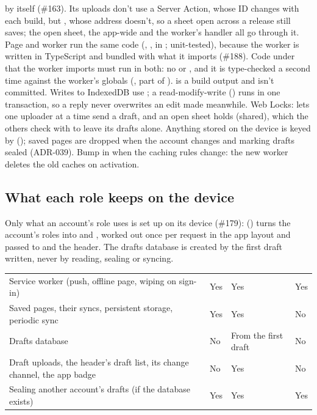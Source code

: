 by itself (\#163). Its uploads don't use a Server Action, whose ID changes with each build, but
, whose address doesn't, so a sheet open across a release still
saves; the open sheet, the app-wide  and the worker's  handler
all go through it. Page and worker run the same code (, ,
 in ; unit-tested), because the worker is written in
TypeScript and bundled with what it imports (\#188). Code under  that the worker
imports must run in both: no  or , and it is type-checked a second
time against the worker's globals (, part of ).
 is a build output and isn't committed. Writes to IndexedDB use ; a read-modify-write
() runs in one transaction, so a reply never overwrites an edit made
meanwhile. Web Locks:  lets one uploader at a time send a draft,
and an open sheet holds  (shared), which the others
check with  to leave its drafts alone. Anything stored
on the device is keyed by  (); saved pages
are dropped when the account changes and marking drafts sealed (ADR-039). Bump  in  when the caching rules
change: the new worker deletes the old caches on activation.

\subsection*{What each role keeps on the device}
Only what an account's role uses is set up on its device (\#179): 
() turns the account's roles into  and ,
worked out once per request in the app layout and passed to  and the header.
The drafts database is created by the first draft written, never by reading, sealing or syncing.

{\tablefont
\begin{xltabular}{\linewidth}{@{}L P{20mm} P{20mm} P{22mm}@{}}
  \toprule
   &  &  & \\
  \midrule
  \endhead
  Service worker (push, offline page, wiping on sign-in) & Yes & Yes & Yes\\
  Saved pages, their syncs, persistent storage, periodic sync & Yes & Yes & No\\
  Drafts database  & No & From the first draft & No\\
  Draft uploads, the header's draft list, its change channel, the app badge & No & Yes & No\\
  Sealing another account's drafts (if the database exists) & Yes & Yes & Yes\\
  \bottomrule
\end{xltabular}}

